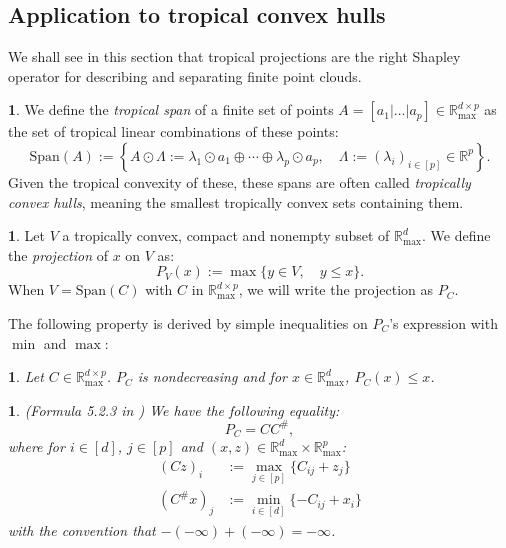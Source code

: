 \documentclass[oneside,english]{amsart}
\numberwithin{equation}{section}
\numberwithin{figure}{section}
\theoremstyle{plain}
\theoremstyle{definition}
\newtheorem{defn}[thm]{\protect\definitionname}
\theoremstyle{plain}
\newtheorem{prop}[thm]{\protect\propositionname}
\theoremstyle{remark}
\theoremstyle{plain}
\theoremstyle{definition}
\theoremstyle{definition}
\providecommand{\definitionname}{Definition}
\providecommand{\propositionname}{Proposition}
\begin{document}
\subsection{Application to tropical convex hulls}

We shall see in this section that tropical projections are the right Shapley operator for describing and separating finite point clouds.

\begin{defn}
We define the \emph{tropical span} of a finite set of points $A=[a_{1}|\ldots|a_{p}]\in\mathbb{R}_{\max}^{d\times p}$
as the set of tropical linear combinations of these points:
\[
\text{Span}(A):=\left\{ A\odot\Lambda:=\lambda_{1}\odot a_{1}\oplus\cdots\oplus\lambda_{p}\odot a_{p},\quad\Lambda:=(\lambda_{i})_{i\in[p]}\in\mathbb{R}^{p}\right\} .
\]
Given the tropical convexity of these, these spans are often called
\emph{tropically convex hulls}, meaning the smallest tropically convex
sets containing them.
\end{defn}

\begin{defn}
Let $V$ a tropically convex, compact and nonempty subset of $\mathbb{R}_{\max}^{d}$.
We define the \emph{projection} of $x$ on $V$ as:
\[
P_{V}(x):=\max\{y\in V,\quad y\le x\}.
\]
When $V=\text{Span}(C)$ with $C$ in $\mathbb{R}_{\max}^{d\times p}$,
we will write the projection as $P_{C}$.
\end{defn}

The following property is derived by simple inequalities on $P_{C}$'s
expression with $\min$ and $\max$:
\begin{prop}
\label{prop:(Nondecreasing)}Let $C\in\mathbb{R}_{\max}^{d\times p}$.
$P_{C}$ is nondecreasing and for $x\in \mathbb{R}^d_\text{max}$, $P_{C}(x)\le x$.
\end{prop}

\begin{prop} (Formula 5.2.3 in \cite{Maclagan2015})
We have the following equality:
\[
P_{C}=CC^{\#},
\]
where for $i\in[d]$, $j\in[p]$ and $(x,z)\in\mathbb{R}_{\max}^{d}\times\mathbb{R}_{\max}^{p}$:
\begin{align*}
(Cz)_{i} & :=\max_{j\in[p]}\{C_{ij}+z_{j}\}\\
(C^{\#}x)_{j} & :=\min_{i\in[d]}\{-C_{ij}+x_{i}\}
\end{align*}
with the convention that $-(-\infty)+(-\infty)=-\infty$.
\end{prop}
\end{document}
